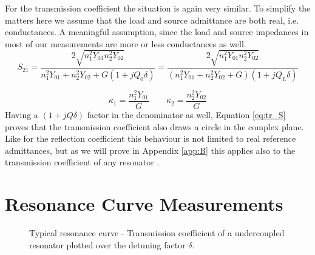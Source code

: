 For the transmission coefficient the situation is again very similar. To simplify the matters here we assume that the load and source admittance are both real, i.e. conductances. A meaningful assumption, since the load and source impedances in most of our measurements are more or less conductances as well.
\begin{equation}\label{eq:tr_S}
S_{21}=\frac{2\sqrt{n_1^2Y_{01}n_2^2Y_{02}}}{n_1^2Y_{01}+n_2^2Y_{02}+G(1+jQ_0\delta)}=\frac{2\sqrt{n_1^2Y_{01}n_2^2Y_{02}}}{(n_1^2Y_{01}+n_2^2Y_{02}+G)(1+jQ_L\delta)}
\end{equation}

\begin{equation}
\kappa_1=\frac{n_1^2Y_{01}}{G} \qquad \kappa_2=\frac{n_2^2Y_{02}}{G}
\end{equation}
Having a $(1+jQ\delta)$ factor in the denominator as well, Equation \eqref{eq:tr_S} proves that the transmission coefficient also draws a circle in the complex plane. Like for the reflection coefficient this behaviour is not limited to real reference admittances, but as we will prove in Appendix \ref{app:B} this applies also to the transmission coefficient of any resonator \cite{ginzton}.
\section{Resonance Curve Measurements}\label{sec:rescurve}

\begin{figure}
\centering
{}
\caption{Typical resonance curve - Transmission coefficient of a undercoupled resonator plotted over the detuning factor $\delta$. }\label{fig:tr_resonance}
\end{figure}


